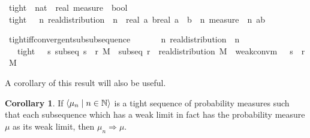 \documentclass[leqno]{article}
\theoremstyle{definition}
\newtheorem{corollary}[theorem]{Corollary}
\newcommand{\bldseq}[2]{\langle{#1}\mid{#2}\rangle}
\begin{document}
\begin{isabellebody}
\isamarkupfalse%
\ tight\ {\isacharcolon}{\isacharcolon}\ {\isachardoublequoteopen}{\isacharparenleft}nat\ {\isasymRightarrow}\ real\ measure{\isacharparenright}\ {\isasymRightarrow}\ bool{\isachardoublequoteclose}\isanewline
{}\ {\isachardoublequoteopen}tight\ {\isasymmu}\ {\isasymequiv}\ {\isacharparenleft}{\isasymforall}n{\isachardot}\ real{\isacharunderscore}distribution\ {\isacharparenleft}{\isasymmu}\ n{\isacharparenright}{\isacharparenright}\ {\isasymand}\ {\isacharparenleft}{\isasymforall}{\isacharparenleft}{\isasymepsilon}{\isacharcolon}{\isacharcolon}real{\isacharparenright}{\isachargreater}{}{\isachardot}\ {\isasymexists}a\ b{\isacharcolon}{\isacharcolon}real{\isachardot}\ a\ {\isacharless}\ b\ {\isasymand}\ {\isacharparenleft}{\isasymforall}n{\isachardot}\ measure\ {\isacharparenleft}{\isasymmu}\ n{\isacharparenright}\ {\isacharbraceleft}a{\isacharless}{\isachardot}{\isachardot}b{\isacharbraceright}\ {\isachargreater}\ {}\ {\isacharminus}\ {\isasymepsilon}{\isacharparenright}{\isacharparenright}{\isachardoublequoteclose}
\end{isabellebody}

\medskip

\begin{isabellebody}
\isamarkupfalse%
\ tight{\isacharunderscore}iff{\isacharunderscore}convergent{\isacharunderscore}subsubsequence{\isacharcolon}\isanewline
\ \ \ {\isasymmu}\isanewline
\ \ \ {\isachardoublequoteopen}{\isasymAnd}n{\isachardot}\ real{\isacharunderscore}distribution\ {\isacharparenleft}{\isasymmu}\ n{\isacharparenright}{\isachardoublequoteclose}\isanewline
\ \ \ {\isachardoublequoteopen}tight\ {\isasymmu}\ {\isacharequal}\ {\isacharparenleft}{\isasymforall}s{\isachardot}\ subseq\ s\ {\isasymlongrightarrow}\ {\isacharparenleft}{\isasymexists}r{\isachardot}\ {\isasymexists}M{\isachardot}\ \ subseq\ r\ {\isasymand}\ real{\isacharunderscore}distribution\ M\ {\isasymand}\ weak{\isacharunderscore}conv{\isacharunderscore}m\ {\isacharparenleft}{\isasymmu}\ {\isasymcirc}\ s\ {\isasymcirc}\ r{\isacharparenright}\ M{\isacharparenright}{\isacharparenright}{\isachardoublequoteclose}
\end{isabellebody}

\medskip

A corollary of this result will also be useful.

\begin{corollary}
If $\bldseq{\mu_n}{n \in \N}$ is a tight sequence of probability measures such that each subsequence which has a weak limit in fact has the probability measure $\mu$ as its weak limit, then $\mu_n \Rightarrow \mu$.
\end{corollary}
\end{document}
